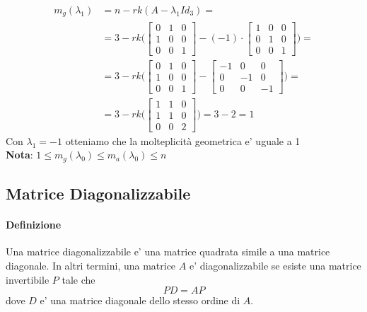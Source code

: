 \documentclass[a4paper, 10pt]{article}
\begin{document}
	\begin{equation*}
		\begin{split}
			m_g(\lambda_1) &= n - rk(A - \lambda_1 Id_3) = \\
			&= 3 - rk \biggl( \begin{bmatrix} 0 & 1 & 0 \\ 1 & 0 & 0 \\ 0 & 0 & 1  \end{bmatrix} - (-1) \cdot 
			   \begin{bmatrix} 1 & 0 & 0 \\ 0 & 1 & 0 \\ 0 & 0 & 1 \end{bmatrix} \biggr) = \\
			&= 3 - rk \biggl( \begin{bmatrix} 0 & 1 & 0 \\ 1 & 0 & 0 \\ 0 & 0 & 1  \end{bmatrix} -  
			   \begin{bmatrix} -1 & 0 & 0 \\ 0 & -1 & 0 \\ 0 & 0 & -1 \end{bmatrix} \biggr) = \\
			 &= 3 - rk \biggl( \begin{bmatrix} 1 & 1 & 0 \\ 1 & 1 & 0 \\ 0 & 0 & 2  \end{bmatrix}  \biggr)  = 3 - 2 = 1
		\end{split}
	\end{equation*}
	Con $\lambda_1 = -1$ otteniamo che la molteplicità geometrica e' uguale a 1 \\
	\textbf{Nota}: $ 1 \leq m_g(\lambda_0) \leq m_a(\lambda_0) \leq n $
 	
	\subsection{Matrice Diagonalizzabile}
	\paragraph*{Definizione}
	Una matrice diagonalizzabile e' una matrice quadrata simile a una matrice diagonale. 
	In altri termini, una matrice $A$ e' diagonalizzabile se esiste una matrice invertibile $P$ tale che 
	\[PD = AP \] dove $D$ e' una matrice diagonale dello stesso ordine di $A$.
	
\end{document}
